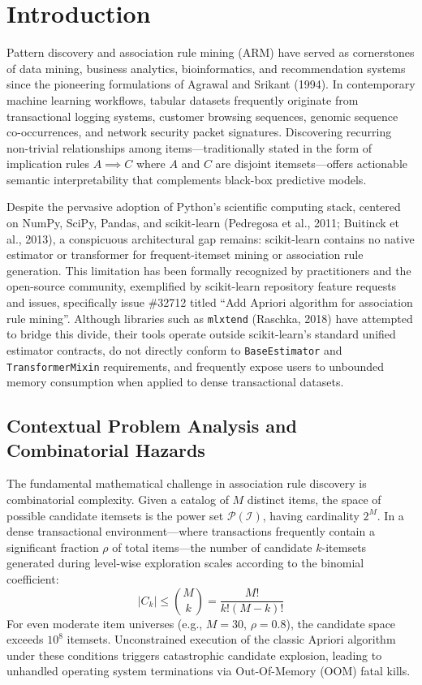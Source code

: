\documentclass[11pt,a4paper]{article}
\begin{document}
\section{Introduction}

Pattern discovery and association rule mining (ARM) have served as cornerstones of data mining, business analytics, bioinformatics, and recommendation systems since the pioneering formulations of Agrawal and Srikant (1994). In contemporary machine learning workflows, tabular datasets frequently originate from transactional logging systems, customer browsing sequences, genomic sequence co-occurrences, and network security packet signatures. Discovering recurring non-trivial relationships among items—traditionally stated in the form of implication rules $A \implies C$ where $A$ and $C$ are disjoint itemsets—offers actionable semantic interpretability that complements black-box predictive models.

Despite the pervasive adoption of Python's scientific computing stack, centered on NumPy, SciPy, Pandas, and scikit-learn (Pedregosa et al., 2011; Buitinck et al., 2013), a conspicuous architectural gap remains: scikit-learn contains no native estimator or transformer for frequent-itemset mining or association rule generation. This limitation has been formally recognized by practitioners and the open-source community, exemplified by scikit-learn repository feature requests and issues, specifically issue \#32712 titled ``Add Apriori algorithm for association rule mining''. Although libraries such as \texttt{mlxtend} (Raschka, 2018) have attempted to bridge this divide, their tools operate outside scikit-learn's standard unified estimator contracts, do not directly conform to \texttt{BaseEstimator} and \texttt{TransformerMixin} requirements, and frequently expose users to unbounded memory consumption when applied to dense transactional datasets.

\subsection{Contextual Problem Analysis and Combinatorial Hazards}
The fundamental mathematical challenge in association rule discovery is combinatorial complexity. Given a catalog of $M$ distinct items, the space of possible candidate itemsets is the power set $\mathcal{P}(\mathcal{I})$, having cardinality $2^M$. In a dense transactional environment—where transactions frequently contain a significant fraction $\rho$ of total items—the number of candidate $k$-itemsets generated during level-wise exploration scales according to the binomial coefficient:
\begin{equation}
|C_k| \le \binom{M}{k} = \frac{M!}{k!(M-k)!}
\end{equation}
For even moderate item universes (e.g., $M = 30$, $\rho = 0.8$), the candidate space exceeds $10^8$ itemsets. Unconstrained execution of the classic Apriori algorithm under these conditions triggers catastrophic candidate explosion, leading to unhandled operating system terminations via Out-Of-Memory (OOM) fatal kills.
\end{document}
